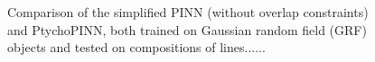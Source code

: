 \documentclass[sn-mathphys]{sn-jnl}%
\theoremstyle{thmstyleone}%
\theoremstyle{thmstyletwo}%
\theoremstyle{thmstylethree}%
\begin{document}
\begin{figure}%
    \centering
    \caption{Comparison of the simplified PINN (without overlap constraints) and PtychoPINN, both trained on Gaussian random field (GRF) objects and tested on compositions of lines......}
\label{fig:gen}%
\end{figure}


\end{document}
